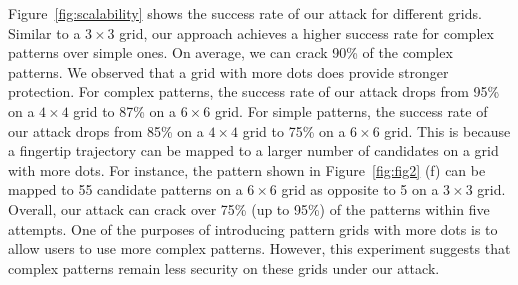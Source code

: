         Figure~\ref{fig:scalability} shows the success rate of our attack
        for different grids. Similar to a $3 \times 3$ grid, our
        approach achieves a higher success rate for complex patterns over
        simple ones. On average, we can crack 90\% of the complex patterns.
        We observed that a grid with more dots does provide
        stronger protection. For complex patterns, the success rate of our
        attack drops from 95\% on a $4 \times 4$ grid to 87\% on a $6 \times
        6$ grid. For simple patterns, the success rate of our attack drops
        from 85\% on a $4 \times 4$ grid to 75\% on a $6 \times 6$ grid. This
        is because a fingertip trajectory can be mapped to a larger number of
        candidates on a grid with more dots. For instance, the pattern shown
        in Figure~\ref{fig:fig2} (f) can be mapped to 55
        candidate patterns on a $6 \times 6$ grid as opposite to 5 on a $3
        \times 3$ grid. Overall, our attack can crack over 75\% (up to 95\%)
        of the patterns within five attempts. One of the purposes of introducing
        pattern grids with more dots is to allow users to use more complex
        patterns. However, this experiment suggests that complex patterns remain less security on
         these grids under our attack.
